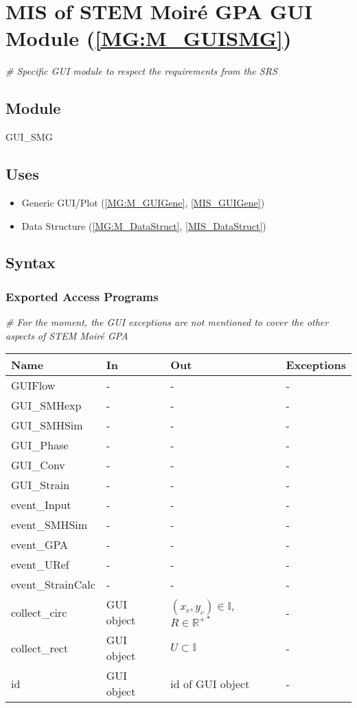 \documentclass[12pt, titlepage]{article}
\newcommand{\progname}{STEM Moir{\'e} GPA}
\begin{document}
\section{MIS of STEM Moir{\'e} GPA GUI Module 
(\texorpdfstring{\cref{MG:M_GUISMG}}))} \label{MIS_GUISMG}

\noindent\textit{{\#} Specific GUI module to respect the requirements from the 
SRS}\medskip

\subsection{Module}
GUI{\_}SMG
\subsection{Uses}
\begin{itemize}
\item Generic GUI/Plot (\cref{MG:M_GUIGene}, \cref{MIS_GUIGene})
\item Data Structure (\cref{MG:M_DataStruct}, \cref{MIS_DataStruct})
\end{itemize}

\subsection{Syntax}

\subsubsection{Exported Access Programs}

\noindent\textit{{\#} For the moment, the GUI exceptions are not mentioned to 
cover the other aspects of \progname{}}\medskip

\begin{center}
\begin{tabular}{p{4cm} p{2cm} p{4cm} p{2cm}}
\hline
\textbf{Name} & \textbf{In} & \textbf{Out} & \textbf{Exceptions} \\
\hline
GUIFlow & - & - & - \\
GUI{\_}SMHexp & - & - & - \\
GUI{\_}SMHSim & - & - & - \\
GUI{\_}Phase & - & - & - \\
GUI{\_}Conv & - & - & - \\
GUI{\_}Strain & - & - & - \\
event{\_}Input & - & - & - \\
event{\_}SMHSim & - & - & - \\
event{\_}GPA & - & - & - \\
event{\_}URef & - & - & - \\
event{\_}StrainCalc & - & - & - \\
collect{\_}circ & GUI object & $(x_c,y_c)\in\mathbb{I}$,$R \in\mathbb{R}^{+*}$ & 
- \\
collect{\_}rect & GUI object & $U \subset \mathbb{I}$ & -\\
id & GUI object & id of GUI object & - \\
\hline
\end{tabular}
\end{center}
\end{document}
